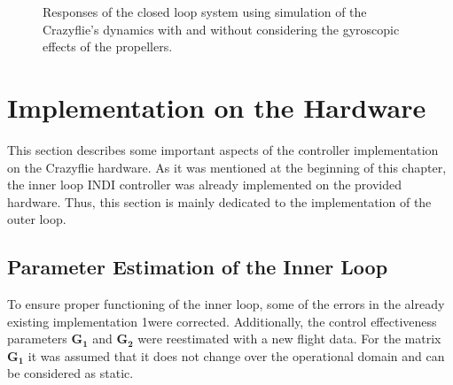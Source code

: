 \documentclass[11pt, a4paper, twoside]{report}
\begin{document}
\begin{figure}[H]
	\centering 
	\captionsetup{justification=centering, singlelinecheck=off, font=bf, belowskip=-0.5cm}
	\caption[Responses of the closed loop system with and without gyroscopic effects.]{Responses of the closed loop system using simulation of the Crazyflie's dynamics with and without considering the gyroscopic effects of the propellers.}
	\label{fig:g2_comp}
\end{figure}

\section{Implementation on the Hardware} \label{sec:implementation_on_hardware}

This section describes some important aspects of the controller implementation on the Crazyflie hardware. As it was mentioned at the beginning of this chapter, the inner loop \acrshort{INDI} controller was already implemented on the provided hardware. Thus, this section is mainly dedicated to the implementation of the outer loop.

\subsection{Parameter Estimation of the Inner Loop} \label{subsec:parameter_estimation_inner}

To ensure proper functioning of the inner loop, some of the errors in the already existing implementation 1were corrected. Additionally, the control effectiveness parameters $\bm{G_1}$ and $\bm{G_2}$ were reestimated with a new flight data. For the matrix $\bm{G_1}$ it was assumed that it does not change over the operational domain and can be considered as static. 
\end{document}
